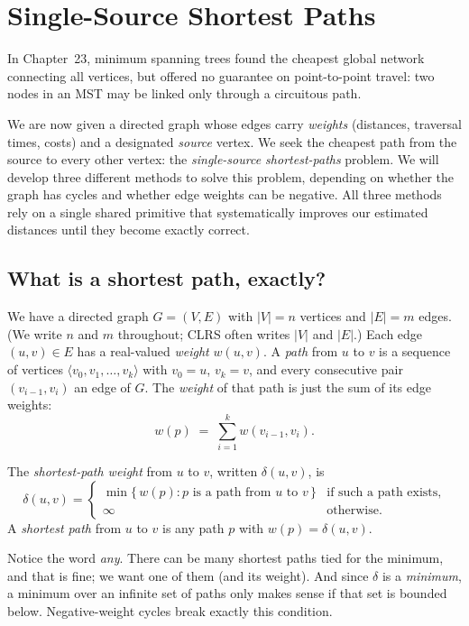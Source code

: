 \chapter{Single-Source Shortest Paths}

In Chapter~23, minimum spanning trees found the cheapest global network connecting all vertices, but offered no guarantee on point-to-point travel: two nodes in an MST may be linked only through a circuitous path.

We are now given a directed graph whose edges carry \emph{weights} (distances, traversal times, costs) and a designated \emph{source} vertex. We seek the cheapest path from the source to every other vertex: the \emph{single-source shortest-paths} problem. We will develop three different methods to solve this problem, depending on whether the graph has cycles and whether edge weights can be negative. All three methods rely on a single shared primitive that systematically improves our estimated distances until they become exactly correct.

\chapterline

\section{What is a shortest path, exactly?}

We have a directed graph $G = (V, E)$ with $|V| = n$ vertices and $|E| = m$
edges. (We write $n$ and $m$ throughout; CLRS often writes $|V|$ and $|E|$.) Each
edge $(u, v) \in E$ has a real-valued \emph{weight} $w(u, v)$. A \emph{path} from
$u$ to $v$ is a sequence of vertices $\langle v_0, v_1, \dots, v_k\rangle$ with
$v_0 = u$, $v_k = v$, and every consecutive pair $(v_{i-1}, v_i)$ an edge of $G$.
The \emph{weight} of that path is just the sum of its edge weights:
\[
w(p) \;=\; \sum_{i=1}^{k} w(v_{i-1}, v_i).
\]

\begin{definition}\label{ch24:def-delta}
The \emph{shortest-path weight} from $u$ to $v$, written $\delta(u, v)$, is
\[
\delta(u, v) =
\begin{cases}
\min\{\, w(p) : p \text{ is a path from } u \text{ to } v \,\} & \text{if such a path exists,}\\
\infty & \text{otherwise.}
\end{cases}
\]
A \emph{shortest path} from $u$ to $v$ is any path $p$ with $w(p) = \delta(u, v)$.
\end{definition}

Notice the word \emph{any}. There can be many shortest paths tied for the
minimum, and that is fine; we want one of them (and its weight). And since
$\delta$ is a \emph{minimum}, a minimum over an infinite set of paths only
makes sense if that set is bounded below. Negative-weight cycles break
exactly this condition.


